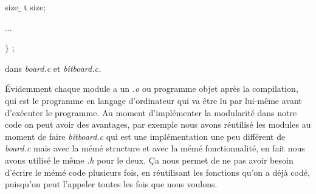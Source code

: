 \documentclass[a4paper,12pt]{article}
\begin{document}
\begin{justify}
\hspace*{0.49in}\hspace*{0.49in}\hspace*{0.49in}\hspace*{0.49in}\hspace*{0.49in}\hspace*{0.49in}size$ \_ $ t size;
\end{justify}\par

\begin{justify}
\hspace*{0.49in}\hspace*{0.49in}\hspace*{0.49in}\hspace*{0.49in}\hspace*{0.49in}\hspace*{0.49in}...
\end{justify}\par

\begin{justify}
\hspace*{0.49in}\hspace*{0.49in}\hspace*{0.49in}\hspace*{0.49in}\hspace*{0.49in}$ \} $ ;
\end{justify}\par

\begin{justify}
dans \textit{board.c }et \textit{bitboard.c.}
\end{justify}\par

\begin{justify}
Évidemment chaque module a un \textit{.o} ou programme objet après la compilation, qui est le programme en langage d’ordinateur qui va être lu par lui-même avant d’exécuter le programme. Au moment d’implémenter la modularité dans notre code on peut avoir des avantages, par exemple nous avons réutilisé les modules au moment de faire \textit{bitboard.c} qui est une implémentation une peu différent de\textit{ board.c} mais avec la mémé structure et avec la mémé fonctionnalité, en fait nous avons utilisé le même \textit{.h} pour le deux. Ça nous permet de ne pas avoir besoin d’écrire le mémé code plusieurs fois, en réutilisant les fonctions qu’on a déjà codé, puisqu’on peut l’appeler toutes les fois que nous voulons. 
\end{justify}\par
\end{document}
